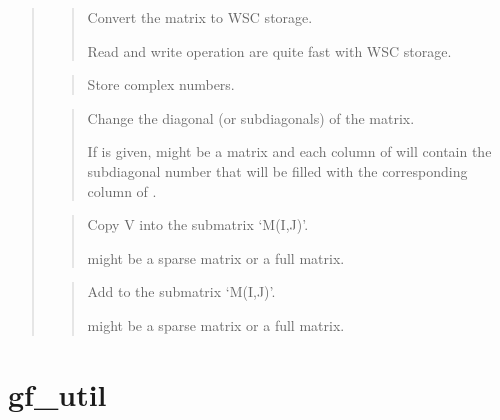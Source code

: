 \documentclass[a4paper,11pt,english]{sphinxmanual}
\begin{document}
\begin{quote}
\begin{quote}
Convert the matrix to WSC storage.

Read and write operation are quite fast with WSC storage.
\end{quote}

\begin{quote}

Store complex numbers.
\end{quote}

\begin{quote}

Change the diagonal (or sub\sphinxhyphen{}diagonals) of the matrix.

If  is given,  might be a matrix and each column of  will
contain the sub\sphinxhyphen{}diagonal number that will be filled with the
corresponding column of .
\end{quote}

\begin{quote}

Copy V into the sub\sphinxhyphen{}matrix ‘M(I,J)’.

 might be a sparse matrix or a full matrix.
\end{quote}

\begin{quote}

Add  to the sub\sphinxhyphen{}matrix ‘M(I,J)’.

 might be a sparse matrix or a full matrix.
\end{quote}
\end{quote}


\section{gf\_util}
\label{\detokenize{matlab_octave/cmdref_gf_util:gf-util}}\label{\detokenize{matlab_octave/cmdref_gf_util::doc}}
\end{document}
